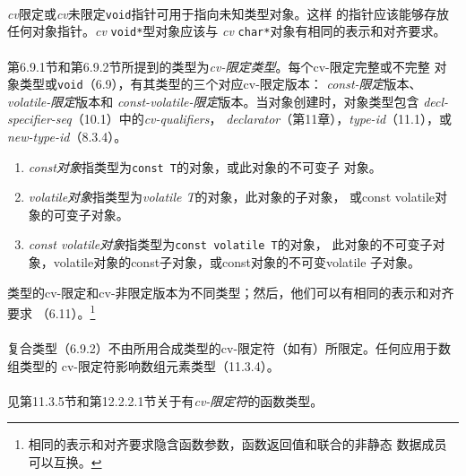 \paragraph{}
\textit{cv}限定或\textit{cv}未限定\texttt{void}指针可用于指向未知类型对象。这样
的指针应该能够存放任何对象指针。\textit{cv} \texttt{void*}型对象应该与
\textit{cv} \texttt{char*}对象有相同的表示和对齐要求。
\paragraph{}
第6.9.1节和第6.9.2节所提到的类型为\textit{cv-限定类型}。每个cv-限定完整或不完整
对象类型或\texttt{void}（6.9），有其类型的三个对应cv-限定版本：
\textit{const-限定}版本、\textit{volatile-限定}版本和
\textit{const-volatile-限定}版本。当对象创建时，对象类型包含
\textit{decl-specifier-seq}（10.1）中的\textit{cv-qualifiers}，
\textit{declarator}（第11章），\textit{type-id}（11.1），或
\textit{new-type-id}（8.3.4）。
\begin{enumerate}
  \item{\textit{const对象}指类型为\texttt{const T}的对象，或此对象的不可变子
    对象。}
  \item{\textit{volatile对象}指类型为\textit{volatile T}的对象，此对象的子对象，
    或const volatile对象的可变子对象。}
  \item{\textit{const volatile对象}指类型为\texttt{const volatile T}的对象，
    此对象的不可变子对象，volatile对象的const子对象，或const对象的不可变volatile
    子对象。}
\end{enumerate}
类型的cv-限定和cv-非限定版本为不同类型；然后，他们可以有相同的表示和对齐要求
（6.11）。\footnote{相同的表示和对齐要求隐含函数参数，函数返回值和联合的非静态
数据成员可以互换。}

\paragraph{}
复合类型（6.9.2）不由所用合成类型的cv-限定符（如有）所限定。任何应用于数组类型的
cv-限定符影响数组元素类型（11.3.4）。

\paragraph{}
见第11.3.5节和第12.2.2.1节关于有\textit{cv-限定符}的函数类型。


